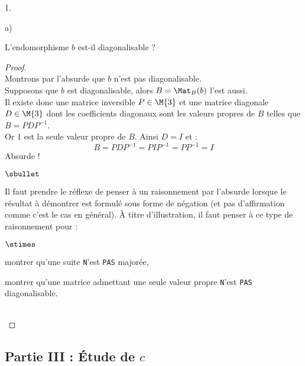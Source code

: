 \documentclass[11pt]{article}%
\begin{document}
\begin{noliste}{1.}
\begin{noliste}{a)}
  \item L'endomorphisme $b$ est-il diagonalisable ?
    
    \begin{proof}~\\
      Montrons par l'absurde que $b$ n'est pas diagonalisable.\\
      Supposons que $b$ est diagonalisable, alors $B = \Mat_{B}(b)$
      l'est aussi.\\
      Il existe donc une matrice inversible $P \in \M{3}$ et une
      matrice diagonale $D \in \M{3}$ dont les coefficients diagonaux
      sont les valeurs propres de $B$ telles que $B = PDP^{-1}$.\\
      Or $1$ est la seule valeur propre de $B$. Ainsi $D = I$ et :
      \[
      B = PDP^{-1} = PIP^{-1} = PP^{-1} = I
      \]
      Absurde !%
      \begin{remarkL}{.95}
        \begin{noliste}{$\sbullet$}        
        \item Il faut prendre le réflexe de penser à un raisonnement par
          l'absurde lorsque le résultat à démontrer est formulé sous forme
          de négation (et pas d'affirmation comme c'est le cas en
          général). À titre d'illustration, il faut penser à ce type de
          raisonnement pour :
          \begin{noliste}{$\stimes$}
          \item montrer qu'une suite {\tt N}'est {\tt PAS} majorée,
          \item montrer qu'une matrice admettant une seule valeur propre
            {\tt N}'est {\tt PAS} diagonalisable.
          \end{noliste}
        \end{noliste}
      \end{remarkL}~\\[-1.4cm]
    \end{proof}
  \end{noliste}
\end{noliste}

\subsection*{Partie III : Étude de $c$}
\end{document}
